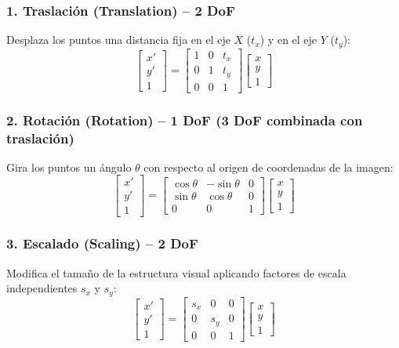 \subsubsection{1. Traslación (Translation) -- 2 DoF}
\noindent
Desplaza los puntos una distancia fija en el eje $X$ ($t_x$) y en el eje $Y$ ($t_y$):
$$\begin{bmatrix} x' \\ y' \\ 1 \end{bmatrix} = \begin{bmatrix} 1 & 0 & t_x \\ 0 & 1 & t_y \\ 0 & 0 & 1 \end{bmatrix} \begin{bmatrix} x \\ y \\ 1 \end{bmatrix}$$

\subsubsection{2. Rotación (Rotation) -- 1 DoF (3 DoF combinada con traslación)}
\noindent
Gira los puntos un ángulo $\theta$ con respecto al origen de coordenadas de la imagen:
$$\begin{bmatrix} x' \\ y' \\ 1 \end{bmatrix} = \begin{bmatrix} \cos\theta & -\sin\theta & 0 \\ \sin\theta & \cos\theta & 0 \\ 0 & 0 & 1 \end{bmatrix} \begin{bmatrix} x \\ y \\ 1 \end{bmatrix}$$

\subsubsection{3. Escalado (Scaling) -- 2 DoF}
\noindent
Modifica el tamaño de la estructura visual aplicando factores de escala independientes $s_x$ y $s_y$:
$$\begin{bmatrix} x' \\ y' \\ 1 \end{bmatrix} = \begin{bmatrix} s_x & 0 & 0 \\ 0 & s_y & 0 \\ 0 & 0 & 1 \end{bmatrix} \begin{bmatrix} x \\ y \\ 1 \end{bmatrix}$$


